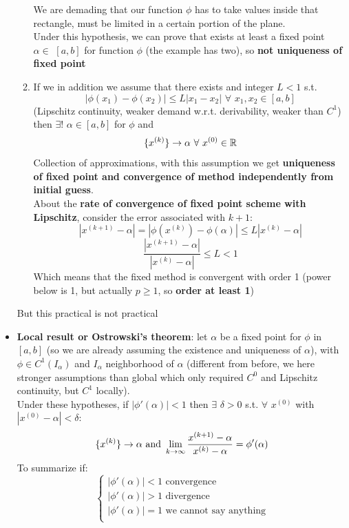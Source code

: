 \begin{itemize}
\begin{enumerate}
        We are demading that our function $\phi$ has to take values inside that rectangle, must be limited in a certain portion of the plane.\\
        Under this hypothesis, we can prove that exists at least a fixed point $\alpha\in\,\,[a,b]$ for function $\phi$ (the example has two), so \textbf{not uniqueness of fixed point}
        \item If we in addition we assume that there exists and integer $L<1$ s.t.
        $$\left|\phi(x_1)-\phi(x_2)\right|\leq L|x_1-x_2|\,\,\forall\,\,x_1,x_2\in[a,b]$$
        (Lipschitz continuity, weaker demand w.r.t. derivability, weaker than $C^1$) then $\exists!\,\,\alpha\in[a,b]$ for $\phi$ and
        $$\{{x^{(k)}}\}\rightarrow\alpha\,\,\forall\,\,x^{(0)}\in\mathbb{R}$$
        Collection of approximations, with this assumption we get \textbf{uniqueness of fixed point and convergence of method independently from initial guess}.\\
        About the \textbf{rate of convergence of fixed point scheme with Lipschitz}, consider the error associated with $k+1$:
        $$|x^{(k+1)}-\alpha|=|\phi(x^{(k)})-\phi(\alpha)|\leq L|x^{(k)}-\alpha|$$
        $$\frac{|x^{(k+1)}-\alpha|}{|x^{(k)}-\alpha|}\leq L < 1$$
        Which means that the fixed method is convergent with order 1 (power below is 1, but actually $p\geq 1$, so \textbf{order at least 1})
    \end{enumerate}
    But this practical is not practical
    \item \textbf{Local result or Ostrowski's theorem}: let $\alpha$ be a fixed point for $\phi$ in $[a,b]$ (so we are already assuming the existence and uniqueness of $\alpha$), with $\phi\in C^1(I_\alpha)$ and $I_\alpha$ neighborhood of $\alpha$ (different from before, we here stronger assumptions than global which only required $C^0$ and Lipschitz continuity, but $C^1$ locally).\\
    Under these hypotheses, if $|\phi'(\alpha)|<1$ then $\exists\,\,\delta>0$ s.t. $\forall\,\,x^{(0)}$ with $|x^{(0)}-\alpha|<\delta$:
    $$\{{x^{(k)}}\}\rightarrow\alpha \text{ and }\lim_{k\rightarrow\infty}\frac{x^{(k+1)}-\alpha}{x^{(k)}-\alpha}=\phi'(\alpha)$$
    To summarize if:
    $$
    \begin{cases}
        |\phi'(\alpha)| < 1 \text{ convergence}\\
        |\phi'(\alpha)| > 1 \text{ divergence}\\
        |\phi'(\alpha)| = 1 \text{ we cannot say anything}\\
    \end{cases}
    $$
\end{itemize}

